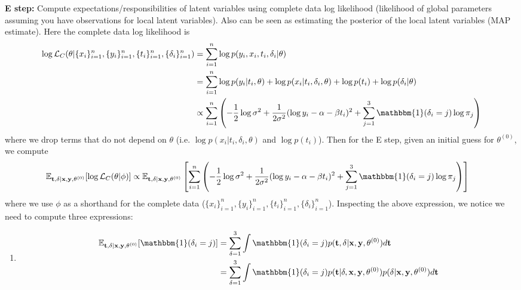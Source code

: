 \documentclass{article}
\begin{document}
\begin{itemize}
\begin{enumerate}[label=(\alph*)]
      \textbf{E step:} Compute expectations/responsibilities of latent variables using complete data log likelihood (likelihood of global parameters assuming you have observations for local latent variables). Also can be seen as estimating the posterior of the local latent variables (MAP estimate). Here the complete data log likelihood is
      \begin{align*}
        \log \mathcal{L}_C (\theta | \{ x_i\}_{i=1}^{n},  \{ y_i\}_{i=1}^{n}, \{ t_i\}_{i=1}^{n}, \{ \delta_i\}_{i=1}^{n}) &= \sum_{i=1}^{n} \log p(y_i, x_i, t_i, \delta_i | \theta) \\
        &= \sum_{i=1}^{n} \log p(y_i | t_i, \theta) + \log p(x_i | t_i, \delta_i, \theta) + \log p(t_i) + \log p(\delta_i | \theta)\\
        &\propto \sum_{i=1}^{n} \left(-\frac{1}{2} \log \sigma^2 + \frac{1}{2 \sigma^2} (\log y_i - \alpha - \beta t_i)^2 + \sum_{j=1}^{3}\mathbbm{1}(\delta_i = j)\log \pi_j \right)
      \end{align*}
      where we drop terms that do not depend on $\theta$ (i.e. $\log p(x_i | t_i, \delta_i, \theta)$ and $\log p(t_i)$).
      Then for the E step, given an initial guess for $\theta^{(0)}$, we compute
      \begin{align*}
        \mathbb{E}_{\mathbf{t}, \mathbf{\delta} | \mathbf{x}, \mathbf{y}, \theta^{(0)}}[\log \mathcal{L}_C (\theta | \phi)] &\propto \mathbb{E}_{\mathbf{t}, \mathbf{\delta} | \mathbf{x}, \mathbf{y}, \theta^{(0)}}\left[\sum_{i=1}^{n} \left(-\frac{1}{2} \log \sigma^2 + \frac{1}{2 \sigma^2} (\log y_i - \alpha - \beta t_i)^2 + \sum_{j=1}^{3}\mathbbm{1}(\delta_i = j)\log \pi_j \right)\right]
      \end{align*}
      where we use $\phi$ as a shorthand for the complete data ($\{ x_i\}_{i=1}^{n},  \{ y_i\}_{i=1}^{n}, \{ t_i\}_{i=1}^{n}, \{ \delta_i\}_{i=1}^{n}$). Inspecting the above expression,
      we notice we need to compute three expressions:
      \begin{enumerate}[label=(\arabic*)]
        \item
          \begin{align*}
            \mathbb{E}_{\mathbf{t}, \mathbf{\delta} | \mathbf{x}, \mathbf{y}, \theta^{(0)}}[\mathbbm{1}(\delta_i = j)] &= \sum_{\delta=1}^{3} \int \mathbbm{1}(\delta_i = j) p(\mathbf{t}, \mathbf{\delta} | \mathbf{x}, \mathbf{y}, \theta^{(0)}) d\mathbf{t}  \\
            &= \sum_{\delta=1}^{3} \int \mathbbm{1}(\delta_i = j) p(\mathbf{t}  | \mathbf{\delta}, \mathbf{x}, \mathbf{y}, \theta^{(0)}) p(\mathbf{\delta} | \mathbf{x}, \mathbf{y}, \theta^{(0)})d\mathbf{t} \\

\end{align*}
\end{enumerate}
\end{enumerate}
\end{itemize}
\end{document}
